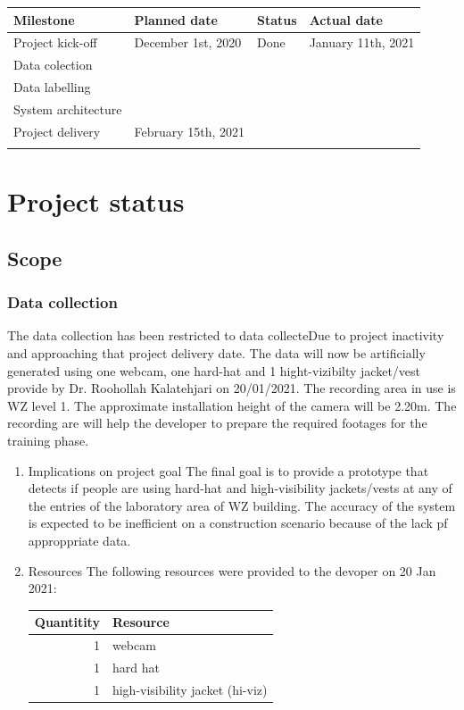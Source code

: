 \documentclass{article}
\begin{document}
\begin{center}
\begin{tabular}{llll}
Milestone & Planned date & Status & Actual date\\
\hline
Project kick-off & December 1st, 2020 & Done & January 11th, 2021\\
Data colection &  &  & \\
Data labelling &  &  & \\
System architecture &  &  & \\
Project delivery & February 15th, 2021 &  & \\
 &  &  & \\
\end{tabular}
\end{center}

\section{Project status}
\label{sec:org3106f0f}

\subsection{Scope}
\label{sec:orgcc66531}

\subsubsection{Data collection}
\label{sec:org00bd590}
The data collection has been restricted to data collecteDue to project inactivity and approaching that project delivery date.
The data will now be artificially generated using one webcam, one hard-hat and 1 hight-vizibilty jacket/vest provide by Dr. Roohollah Kalatehjari on 20/01/2021.
The recording area in use is WZ level 1.
The approximate installation height of the camera will be 2.20m. 
The recording are will help the developer to prepare the required footages for the training phase. 
\begin{enumerate}
\item Implications on project goal
\label{sec:org07102b4}
The final goal is to provide a prototype that detects if people are using hard-hat and high-visibility jackets/vests at any of the entries of the laboratory area of WZ building.
The accuracy of the system is expected to be inefficient on a construction scenario because of the lack pf approppriate data.


\item Resources
\label{sec:org160f1cc}
The following resources were provided to the devoper on 20 Jan 2021:

\begin{center}
\begin{tabular}{rl}
Quantitity & Resource\\
\hline
1 & webcam\\
1 & hard hat\\
1 & high-visibility jacket (hi-viz)\\
\end{tabular}
\end{center}
\end{enumerate}
\end{document}
